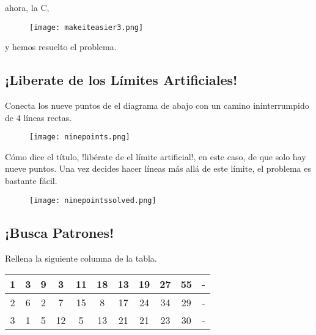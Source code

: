 ahora, la C,

\begin{figure}[!h]
    \centering
    \texttt{[image: makeiteasier3.png]}
\end{figure}

y hemos resuelto el problema.

\subsection{¡Liberate de los Límites Artificiales!}

\begin{example}
    Conecta los nueve puntos de el diagrama de abajo con un camino 
    ininterrumpido de 4 líneas rectas.
\end{example}

\begin{figure}[!h]
    \centering
    \texttt{[image: ninepoints.png]}
\end{figure}

Cómo dice el título, !libérate de el límite artificial!, 
en este caso, de que solo hay nueve puntos. Una vez decides 
hacer líneas más allá de este límite, el problema es 
bastante fácil.

\begin{figure}[!h]
    \centering
    \texttt{[image: ninepointssolved.png]}
\end{figure}

\subsection{¡Busca Patrones!}

\begin{example}
    Rellena la siguiente columna de la tabla.

    \vspace{2mm}
    \begin{center}
        \begin{tabular}{ |c|c|c|c|c|c|c|c|c|c|c| }
            \hline
            1 & 3 & 9 & 3 & 11 & 18 & 13 & 19 & 27 & 55 & - \\
            \hline
            2 & 6 & 2 & 7 & 15 & 8 & 17 & 24 & 34  & 29 & -\\
            \hline
            3 & 1 & 5 & 12 & 5 & 13 & 21 & 21 & 23 & 30 & -\\
            \hline
        \end{tabular}
    \end{center}
\end{example}

